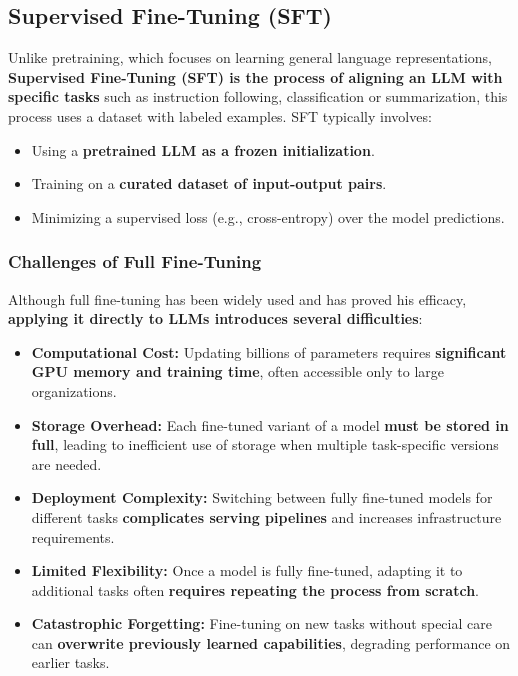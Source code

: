 \documentclass[11pt,a4paper]{article}
\begin{document}
\subsection{Supervised Fine-Tuning (SFT)} 
Unlike pretraining, which focuses on learning general language representations, \textbf{Supervised Fine-Tuning (SFT) is the process of aligning an LLM with specific tasks} such as instruction following, classification or summarization, this process uses a dataset with labeled examples.
SFT typically involves:
\begin{itemize}[leftmargin=1.5em]
    \item Using a \textbf{pretrained LLM as a frozen initialization}.
    \item Training on a \textbf{curated dataset of input-output pairs}.
    \item Minimizing a supervised loss (e.g., cross-entropy) over the model predictions.
\end{itemize}

\subsubsection{Challenges of Full Fine-Tuning}
Although full fine-tuning has been widely used and has proved his efficacy, \textbf{applying it directly to LLMs introduces several difficulties}:

\begin{itemize}[leftmargin=1.5em]
    \item \textbf{Computational Cost:} Updating billions of parameters requires \textbf{significant GPU memory and training time}, often accessible only to large organizations.
    \item \textbf{Storage Overhead:} Each fine-tuned variant of a model \textbf{must be stored in full}, leading to inefficient use of storage when multiple task-specific versions are needed.
    \item \textbf{Deployment Complexity:} Switching between fully fine-tuned models for different tasks \textbf{complicates serving pipelines} and increases infrastructure requirements.
    \item \textbf{Limited Flexibility:} Once a model is fully fine-tuned, adapting it to additional tasks often \textbf{requires repeating the process from scratch}.
    \item \textbf{Catastrophic Forgetting:} Fine-tuning on new tasks without special care can \textbf{overwrite previously learned capabilities}, degrading performance on earlier tasks.
\end{itemize}
\end{document}
